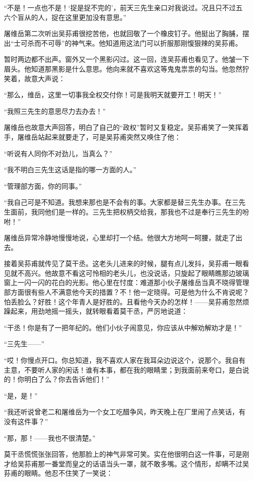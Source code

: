 \par “不是！一点也不是！‘捉是捉不完的’，前天三先生亲口对我说过。况且只不过五六个盲从的人，捉在这里更加没有意思。”
\par 屠维岳第二次听出吴荪甫很挖苦他，也就回敬了一个橡皮钉子。他挺出了胸脯，摆出“士可杀而不可辱”的神气来。他知道用这法门可以折服那刚愎狠辣的吴荪甫。
\par 暂时两边都不出声。窗外又一个黑影闪过。这一回，连吴荪甫也看见了。他皱一下眉头。他知道那黑影是什么意思。他向来就不喜欢这等鬼鬼祟祟的勾当。他忽然狞笑着，故意大声说：
\par “那么，维岳，这里一切事我全权交付你！可是我明天就要开工！明天！”
\par “我照三先生的意思尽力去办去！”
\par 屠维岳也故意大声回答，明白了自己的“政权”暂时又复稳定。吴荪甫笑了一笑挥着手，屠维岳站起来就要走了，可是吴荪甫突然又唤住了他：
\par “听说有人同你不对劲儿，当真么？”
\par “我不明白三先生这话是指的哪一方面的人。”
\par “管理部方面，你的同事。”
\par “我自己可是不知道。我想来那也是不会有的事。大家都是替三先生办事。在三先生面前，我同他们是一样的。三先生把权柄交给我，那我也不过是奉行三先生的吩咐！”
\par 屠维岳异常冷静地慢慢地说，心里却打一个结。他很大方地呵一呵腰，就走了出去。
\par 接着吴荪甫就传见了莫干丞。这老头儿进来的时候，腿有点儿发抖，吴荪甫一眼看见就不高兴。他故意不看这可怜相的老头儿，也没说话，只旋起了眼睛瞧那边玻璃窗上一闪一闪的花白的光影。他心里在忖度：难道那小伙子屠维岳当真不晓得管理部方面很有些人不满意他今天的措置？不！他一定晓得。可是他为什么不肯说呢？怕丢脸么？好胜！这个年青人是好胜的。且看他今天办的怎样！——吴荪甫忽然烦躁起来，用劲地摇一摇头，就转眼看着莫干丞，严厉地说道：
\par “干丞！你是有了一把年纪的。他们小伙子闹意见，你应该从中解劝解劝才是！”
\par “三先生——”
\par “哎！你慢点开口。你总知道，我不喜欢人家在我耳朵边说这个，说那个。我自有主意，不要听人家的闲话！谁有本事，都在我的眼睛里；到我面前来夸口，是白说的！你明白了么？你去告诉他们！”
\par “是，是！”
\par “我还听说曾老二和屠维岳为一个女工吃醋争风，昨天晚上在厂里闹了点笑话，有没有这件事？”
\par “那，那！——我也不很清楚。”
\par 莫干丞慌慌张张回答，他那脸上的神气非常可笑。实在他很明白这一件事，可是刚才给吴荪甫那一番堂而皇之的话语当头一罩，就不敢多嘴。这个情形，却瞒不过吴荪甫的眼睛。他忍不住笑了一笑说：
